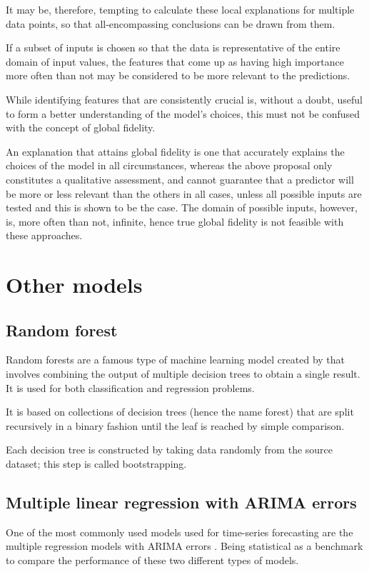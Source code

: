 It may be, therefore, tempting to calculate these local explanations for multiple data points, so that all-encompassing conclusions can be drawn from them. 

If a subset of inputs is chosen so that the data is representative of the entire domain of input values, the features that come up as having high importance more often than not may be considered to be more relevant to the predictions. 

While identifying features that are consistently crucial is, without a doubt, useful to form a better understanding of the model’s choices, this must not be confused with the concept of global fidelity. 

An explanation that attains global fidelity is one that accurately explains the choices of the model in all circumstances, whereas the above proposal only constitutes a qualitative assessment, and cannot guarantee that a predictor will be more or less relevant than the others in all cases, unless all possible inputs are tested and this is shown to be the case. The domain of possible inputs, however, is, more often than not, infinite, hence true global fidelity is not feasible with these approaches.

\chapter{Other models} \label{othermod}
\section{Random forest} \label{randomfor}
Random forests are a famous type of machine learning model created by \citeauthor{Breiman2001} \autocite{Breiman2001} that involves combining the output of multiple decision trees to obtain a single result. It is used for both classification and regression problems.

It is based on collections of decision trees (hence the name forest) that are split recursively in a binary fashion until the leaf is reached by simple comparison. 

Each decision tree is constructed by taking data randomly from the source dataset; this step is called bootstrapping.
\section{Multiple linear regression with ARIMA errors}
One of the most commonly used models used for time-series forecasting are the multiple regression models with ARIMA errors \autocite{TimeSeries}. Being statistical as a benchmark to compare the performance of these two different types of models.   